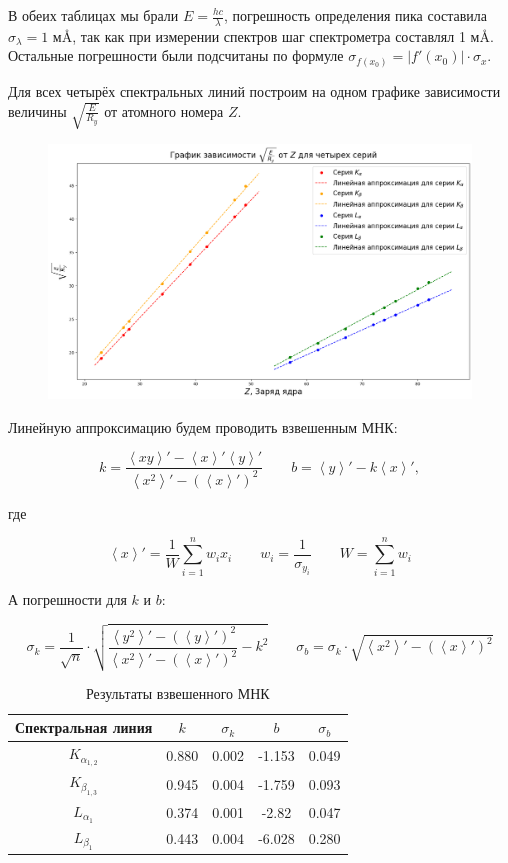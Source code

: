 \documentclass[a4paper, 12pt]{article}%
\begin{document}
		В обеих таблицах мы брали $E = \frac{h c}{\lambda}$,  погрешность определения пика составила $\sigma_{\lambda} = 1$ м\AA, так как при измерении спектров шаг спектрометра составлял 1 м\AA. Остальные погрешности были подсчитаны по формуле $\sigma_{f(x_0)} = |f'(x_0)| \cdot \sigma_{x}$. 

		Для всех четырёх спектральных линий построим на одном графике зависимости величины $\sqrt{\frac{E}{R_y}}$ от атомного номера $Z$.

		\begin{figure}[h!]
			\centering
			\includegraphics[width=1.02\linewidth]{График.png}
		\end{figure}

	\newpage

		Линейную аппроксимацию будем проводить взвешенным МНК: 

		\[k = \dfrac{\left<xy\right>' - \left<x\right>' \left<y\right>'}{\left<x^2\right>' - \left(\left<x\right>'\right)^2} \qquad
b = \left<y\right>' - k \left<x\right>',\]

где 

		\[\left<x\right>' = \dfrac{1}{W}\sum\limits_{i = 1}^n w_ix_i \qquad w_i = \dfrac{1}{\sigma_{y_i}} \qquad W = \sum\limits_{i = 1}^nw_i\]

А погрешности для $k$ и $b$:

		\[\sigma_k = \dfrac{1}{\sqrt{n}} \cdot \sqrt{\dfrac{\left<y^2\right>' - \left(\left<y\right>'\right)^2}{\left<x^2\right>' - \left(\left<x\right>'\right)^2} - k^2} \qquad \sigma_b = \sigma_k \cdot \sqrt{\left<x^2\right>' - \left(\left<x\right>'\right)^2}\]

		\begin{table}[!ht]
			\centering
			\begin{tabular}{|c|c|c|c|c|}
				\hline
				Спектральная линия & $k$ & $\sigma_k$ & $b$ & $\sigma_b$ \\
				\hline
				$K_{\alpha_{1, 2}}$ & 0.880 & 0.002 & -1.153 & 0.049 \\ 
				$K_{\beta_{1, 3}}$ & 0.945 & 0.004 & -1.759 & 0.093 \\ 
				$L_{\alpha_1}$ & 0.374 & 0.001 & -2.82 & 0.047 \\ 
				$L_{\beta_1}$ & 0.443 & 0.004 & -6.028 & 0.280 \\
				\hline
			\end{tabular}
			\caption{Результаты взвешенного МНК}
		\end{table}
\end{document}
